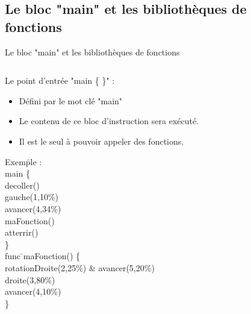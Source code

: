 \documentclass{bredelebeamer}
\begin{document}
\subsection{Le bloc "main" et les bibliothèques de fonctions} 
\begin{frame}{Le bloc "main" et les bibliothèques de fonctions} 

\begin{columns}

\begin{column}{0.5\textwidth}


Le point d'entrée "main \{ \}" :\\
\begin{itemize}
\item Défini par le mot clé "main"
\item Le contenu de ce bloc d'instruction sera exécuté.
\item Il est le seul à pouvoir appeler des fonctions.
\end{itemize}\pause

\begin{tabbing}
Exem\=ple :\\
	\>\color{Framarouge}main  \{\=\\ 
	\>\>\color{Framarouge}decoller()\\
	\>\>\color{Framarouge}gauche(\color{black}1\color{Framarouge},\color{Framagris}10\%\color{Framarouge})\\ 
	\>\>\color{Framarouge}avancer(\color{black}4\color{Framarouge},\color{Framagris}34\%\color{Framarouge})\\
	\>\>\color{Framarouge}maFonction()\\ 
	\>\>\color{Framarouge}atterrir()\\
	\>\color{Framarouge}\}\\
	
	\>\color{Framarouge}func \=\color{black}maFonction\color{Framarouge}() \{\\ 
	\>\>\color{Framarouge}rotationDroite(\color{black}2\color{Framarouge},\color{Framagris}25\%\color{Framarouge}) \& 
	\color{Framarouge}avancer(\color{black}5\color{Framarouge},\color{Framagris}20\%\color{Framarouge})\\ 
	\>\>\color{Framarouge}droite(\color{black}3\color{Framarouge},\color{Framagris}80\%\color{Framarouge})\\ 
	\>\>\color{Framarouge}avancer(\color{black}4\color{Framarouge},\color{Framagris}10\%\color{Framarouge})\\ 
	\>\color{Framarouge}\}\pause


\end{tabbing}
\end{column}
\end{columns}
\end{frame}
\end{document}
